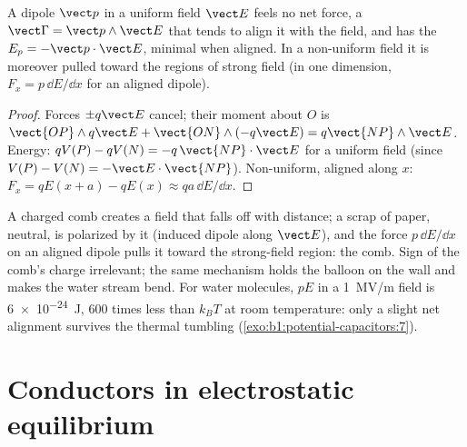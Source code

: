 \begin{proposition}\label{prop:b1:potential-capacitors:dipoleinfield}
A dipole $\vect p$ in a uniform field $\vect E$ feels no net force, a
 $\vect\Gamma = \vect p\wedge\vect E$ that tends to align it with
the field, and has the  $E_p = -\vect p\cdot\vect E$,
minimal when aligned. In a non-uniform field it is moreover pulled
toward the regions of strong field (in one dimension, $F_x = p\,\dd E/\dd x$
for an aligned dipole).
\end{proposition}

\begin{proof}
Forces $\pm q\vect E$ cancel; their moment about $O$ is $\vect{OP}\wedge
q\vect E + \vect{ON}\wedge(-q\vect E) = q\vect{NP}\wedge\vect E$. Energy:
$qV(P) - qV(N) = -q\,\vect{NP}\cdot\vect E$ for a uniform field (since $V(P)
- V(N) = -\vect E\cdot\vect{NP}$). Non-uniform, aligned along $x$: $F_x =
qE(x + a) - qE(x) \approx qa\,\dd E/\dd x$.
\end{proof}

\begin{example}\label{ex:b1:potential-capacitors:comb}
A charged comb creates a field that falls off with distance; a scrap of
paper, neutral, is polarized by it (induced dipole along $\vect E$), and
the force $p\,\dd E/\dd x$ on an aligned dipole pulls it toward the
strong-field region: the comb. Sign of the comb's charge irrelevant;
the same mechanism holds the balloon on the wall and makes the
water stream bend. For water molecules, $pE$ in a \qty{1}{MV/m} field
is \qty{6e-24}{J}, $600$ times less than $k_BT$ at room temperature:
only a slight net alignment survives the thermal tumbling
(\cref{exo:b1:potential-capacitors:7}).
\end{example}

\section{Conductors in electrostatic equilibrium}

